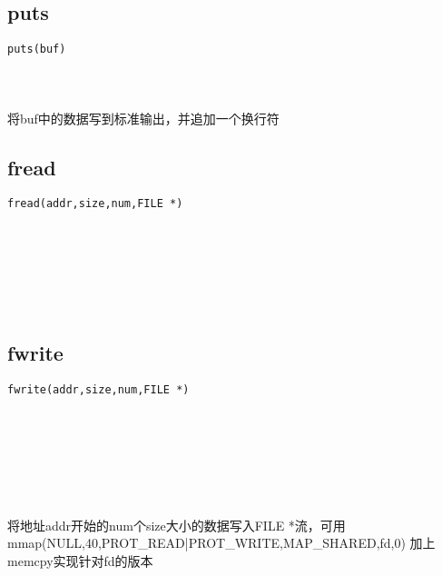\documentclass[10pt,a4paper]{article}
\begin{document}
\subsection{puts}
\begin{spacing}{2.0}
\lstset{language=C,numbers=none}
\begin{lstlisting}
puts(buf)
\end{lstlisting}
{\large\color[rgb]{0.2,0.4,0.6}{buf:}}
\paragraph{ \ \ }将buf中的数据写到标准输出，并追加一个换行符
\end{spacing}

\subsection{fread}
\begin{spacing}{2.0}
\lstset{language=C,numbers=none}
\begin{lstlisting}
fread(addr,size,num,FILE *)
\end{lstlisting}
{\large\color[rgb]{0.2,0.4,0.6}{addr:}} \\
{\large\color[rgb]{0.2,0.4,0.6}{size:}} \\
{\large\color[rgb]{0.2,0.4,0.6}{num:}} \\
{\large\color[rgb]{0.2,0.4,0.6}{*:}}
\paragraph{ \ \ }
\end{spacing}

\subsection{fwrite}
\begin{spacing}{2.0}
\lstset{language=C,numbers=none}
\begin{lstlisting}
fwrite(addr,size,num,FILE *)
\end{lstlisting}
{\large\color[rgb]{0.2,0.4,0.6}{addr:}} \\
{\large\color[rgb]{0.2,0.4,0.6}{size:}} \\
{\large\color[rgb]{0.2,0.4,0.6}{num:}} \\
{\large\color[rgb]{0.2,0.4,0.6}{*:}}
\paragraph{ \ \ }将地址addr开始的num个size大小的数据写入FILE *流，可用mmap(NULL,40,PROT\_READ|PROT\_WRITE,MAP\_SHARED,fd,0) 加上memcpy实现针对fd的版本
\end{spacing}
\end{document}
